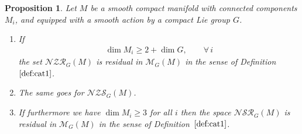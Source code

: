 \documentclass[pdftex]{sigma}%
\numberwithin{equation}{section}
\newtheorem{Proposition}[Theorem]{Proposition}
\begin{document}
\begin{Proposition}\label{pr:ncrgen}
 Let $M$ be a smooth compact manifold with connected components $M_i$, and equipped with a smooth action by a compact Lie group $G$.
 \begin{enumerate}[$(a)$]\itemsep=0pt
 \item\label{item:5} If
 \begin{gather*}
 \dim M_i\ge 2+\dim G,\qquad \forall\, i
 \end{gather*}
 the set $\mathcal{NZR}_G(M)$ is residual in $\mathcal{M}_G(M)$ in the sense of Definition~$\ref{def:cat1}$.
 \item\label{item:7} The same goes for $\mathcal{NZS}_G(M)$.
 \item\label{item:6}
 If furthermore we have $\dim M_i\ge 3$ for all $i$ then the space $\mathcal{NSR}_G(M)$ is residual in $\mathcal{M}_G(M)$ in the sense of Definition~$\ref{def:cat1}$.
 \end{enumerate}
\end{Proposition}
\end{document}
